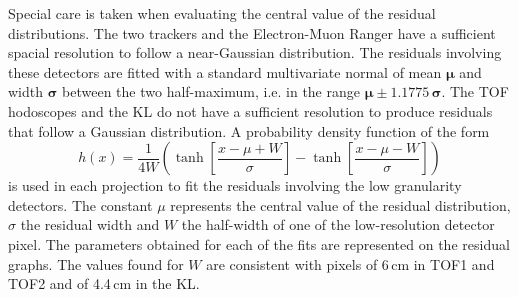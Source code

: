 Special care is taken when evaluating the central value of the residual distributions. The two trackers and the Electron-Muon Ranger have a sufficient spacial resolution to follow a near-Gaussian distribution. The residuals involving these detectors are fitted with a standard multivariate normal of mean $\bm{\mu}$ and width $\bm{\sigma}$ between the two half-maximum, i.e. in the range $\bm{\mu}\pm1.1775\,\bm{\sigma}$. The TOF hodoscopes and the KL do not have a sufficient resolution to produce residuals that follow a Gaussian distribution. A probability density function of the form
\begin{equation}
h(x)=\frac{1}{4W}\left(\tanh\left[\frac{x-\mu+W}{\sigma}\right]-\tanh\left[\frac{x-\mu-W}{\sigma}\right]\right)
\end{equation}
is used in each projection to fit the residuals involving the low granularity detectors. The constant $\mu$ represents the central value of the residual distribution, $\sigma$ the residual width and $W$ the half-width of one of the low-resolution detector pixel. The parameters obtained for each of the fits are represented on the residual graphs. The values found for $W$ are consistent with pixels of 6\,cm in TOF1 and TOF2 and of 4.4\,cm in the KL.
